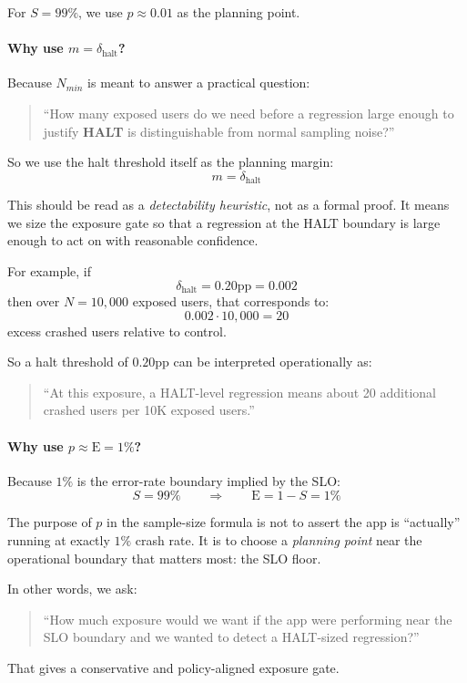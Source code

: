 \documentclass{article}
\newcommand{\E}{\mathrm{E}}
\newcommand{\pp}{\text{pp}}
\newcommand{\dhalt}{\delta_{\text{halt}}}
\begin{document}
For $S = 99\%$, we use $p \approx 0.01$ as the planning point.

\paragraph{Why use $m = \dhalt$?}
Because $N_{min}$ is meant to answer a practical question:

\begin{quote}
``How many exposed users do we need before a regression large enough to justify \textbf{HALT} is distinguishable from normal sampling noise?''
\end{quote}

So we use the halt threshold itself as the planning margin:
\[
m = \dhalt
\]

This should be read as a \emph{detectability heuristic}, not as a formal proof. 
It means we size the exposure gate so that a regression at the HALT boundary is large enough to act on with reasonable confidence.

For example, if
\[
\dhalt = 0.20\pp = 0.002
\]
then over $N = 10{,}000$ exposed users, that corresponds to:
\[
0.002 \cdot 10{,}000 = 20
\]
excess crashed users relative to control.

So a halt threshold of $0.20\pp$ can be interpreted operationally as:
\begin{quote}
``At this exposure, a HALT-level regression means about 20 additional crashed users per 10K exposed users.''
\end{quote}

\paragraph{Why use $p \approx \E = 1\%$?}
Because $1\%$ is the error-rate boundary implied by the SLO:
\[
S = 99\%
\qquad \Longrightarrow \qquad
\E = 1 - S = 1\%
\]

The purpose of $p$ in the sample-size formula is not to assert the app is ``actually'' running at exactly $1\%$ crash rate.
It is to choose a \emph{planning point} near the operational boundary that matters most:
the SLO floor.

In other words, we ask:
\begin{quote}
``How much exposure would we want if the app were performing near the SLO boundary and we wanted to detect a HALT-sized regression?''
\end{quote}

That gives a conservative and policy-aligned exposure gate.
\end{document}
